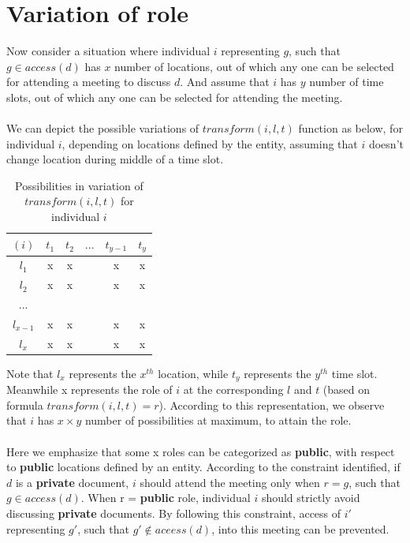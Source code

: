 \documentclass{article}
\begin{document}
\section{Variation of role}
\noindent
Now consider a situation where individual $i$ representing $g$, such that $g \in access(d)$ has $x$ number of locations, out of which any one can be selected for attending a meeting to discuss $d$. And assume that $i$ has $y$ number of time slots, out of which any one can be selected for attending the meeting.\\ \\
We can depict the possible variations of $transform(i, l, t)$ function as below, for individual $i$, depending on locations defined by the entity, assuming that $i$ doesn't change location during middle of a time slot.
\begin{table}[H]
    \centering
    \begin{tabular}{|c|c|c|c|c|c|}
    \hline
    $(i)$ & $t_1$ & $t_2$ & $...$ & $t_{y-1}$ & $t_{y}$ \\
    \hline
    $l_1$ & x & x & \  & x & x \\
    \hline
    $l_2$ & x & x & \  & x & x \\
    \hline
    $...$ & \  & \  & \  & \  & \  \\
    \hline
    $l_{x-1}$ & x & x & \  & x & x \\
    \hline
    $l_{x}$ & x & x & \  & x & x \\
    \hline
    \end{tabular}
    \caption{Possibilities in variation of $transform(i,l,t)$ for individual $i$}
    \label{tab:six_columns_six_rows}
\end{table}

\noindent
Note that $l_x$ represents the $x^{th}$ location, while $t_y$ represents the $y^{th}$ time slot. Meanwhile x represents the role of $i$ at the corresponding $l$ and $t$ (based on formula $transform(i, l, t) = r$). According to this representation, we observe that $i$ has $x \times y$ number of possibilities at maximum, to attain the role.\\ \\
Here we emphasize that some x roles can be categorized as \textbf{public}, with respect to \textbf{public} locations defined by an entity. According to the constraint identified, if $d$ is a \textbf{private} document, $i$ should attend the meeting only when $r = g$, such that $g \in access(d)$. When r = \textbf{public} role, individual $i$ should strictly avoid discussing \textbf{private} documents. By following this constraint, access of $i'$ representing $g'$, such that $g' \notin aceess(d)$, into this meeting can be prevented.\\ \\ 
\end{document}
